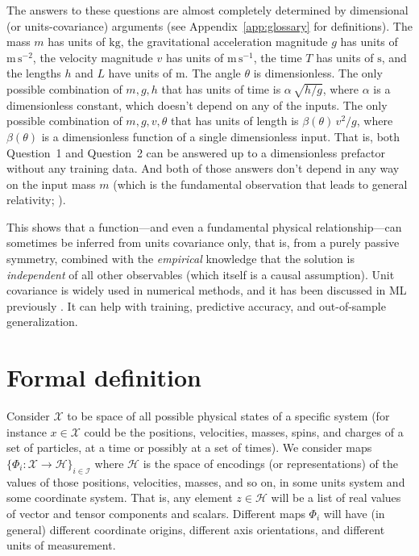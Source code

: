 \documentclass[accepted]{article}
\renewcommand{\mathcal}[1]{\mathscr{#1}} %
\newcommand{\appref}[1]{Appendix~\ref{#1}}
\newcommand{\unit}[1]{\mathrm{#1}}
\newcommand{\kg}{\unit{kg}}
\newcommand{\m}{\unit{m}}
\newcommand{\s}{\unit{s}}
\begin{document}
The answers to these questions are almost completely determined by dimensional (or units-covariance) arguments (see \appref{app:glossary} for definitions).
The mass $m$ has units of $\kg$, the gravitational acceleration magnitude $g$ has units of $\m\,\s^{-2}$, the velocity magnitude $v$ has units of $\m\,\s^{-1}$, the time $T$ has units of $\s$, and the lengths $h$ and $L$ have units of $\m$.
The angle $\theta$ is dimensionless.
The only possible combination of $m, g, h$ that has units of time is $\alpha\,\sqrt{h/g}$, where $\alpha$ is a dimensionless constant, which doesn't depend on any of the inputs.
The only possible combination of $m, g, v, \theta$ that has units of length is $\beta(\theta)\,v^2/g$, where $\beta(\theta)$ is a dimensionless function of a single dimensionless input.
That is, both Question~1 and Question~2 can be answered up to a dimensionless prefactor without any training data.
And both of those answers don't depend in any way on the input mass $m$ (which is the fundamental observation that leads to general relativity; \citealt{gr}).

This shows that a function---and even a fundamental physical relationship---can sometimes be inferred from units covariance only, that is, from a purely passive symmetry, combined with the \emph{empirical} knowledge that the solution is \emph{independent} of all other observables (which itself is a causal assumption).
Unit covariance is widely used in numerical methods, and it has been discussed in ML previously \citep{villar2022dimensionless, bakarji2022dimensionally, xie2022data}.
It can help with training, predictive accuracy, and out-of-sample generalization.

\section{Formal definition}\label{sec:definitions}
Consider $\mathcal{X}$ to be space of all possible physical states of a specific system (for instance $x\in \mathcal X$ could be the positions, velocities, masses, spins, and charges of a set of particles, at a time or possibly at a set of times).
We consider maps $\{\Phi_i: \mathcal{X} \to \mathcal{H}\}_{i\in \mathcal{I}}$ where $\mathcal{H}$ is the space of encodings (or representations) of the values of those positions, velocities, masses, and so on, in some units system and some coordinate system.
That is, any element $z\in \mathcal{H}$ will be a list of real values of vector and tensor components and scalars.
Different maps $\Phi_i$ will have (in general) different coordinate origins, different axis orientations, and different units of measurement.
\end{document}
